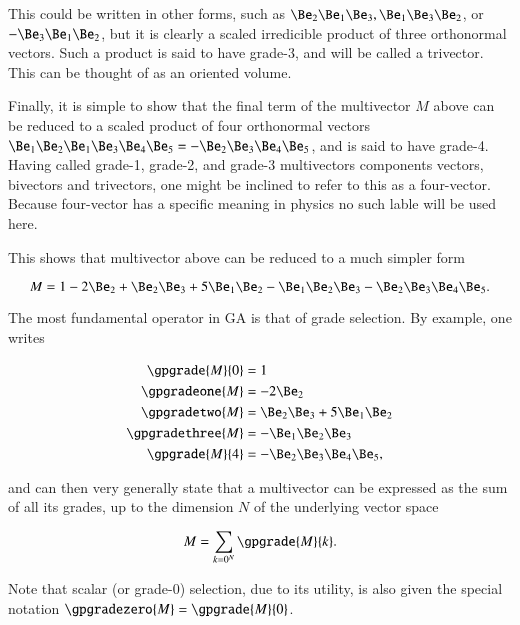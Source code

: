 This could be written in other forms, such as \( \Be_2 \Be_1 \Be_3, \Be_1 \Be_3 \Be_2 \), or \( -\Be_3 \Be_1 \Be_2 \), but it is clearly a scaled irredicible product of three orthonormal vectors.  Such a product is said to have grade-3, and will be called a trivector.  This can be thought of as an oriented volume.

Finally, it is simple to show that the final term of the multivector \( M \) above can be reduced to a scaled product of four orthonormal vectors \( \Be_1 \Be_2 \Be_1 \Be_3 \Be_4 \Be_5 = -\Be_2 \Be_3 \Be_4 \Be_5 \), and is said to have grade-4.  Having called grade-1, grade-2, and grade-3 multivectors components vectors, bivectors and trivectors, one might be inclined to refer to this as a four-vector.  Because four-vector has a specific meaning in physics no such lable will be used here.

This shows that multivector above can be reduced to a much simpler form

\begin{dmath}\label{eqn:SimpleProducts:120}
M = 1 - 2 \Be_2  + \Be_2 \Be_3 + 5 \Be_1 \Be_2 - \Be_1 \Be_2 \Be_3 -\Be_2 \Be_3 \Be_4 \Be_5.
\end{dmath}

The most fundamental operator in GA is that of grade selection.  By example, one writes

\begin{dmath}\label{eqn:SimpleProducts:140}
\begin{aligned}
   \gpgrade{M}{0} &= 1 \\
   \gpgradeone{M} &= - 2 \Be_2 \\
   \gpgradetwo{M} &= \Be_2 \Be_3 + 5 \Be_1 \Be_2 \\
   \gpgradethree{M} &= - \Be_1 \Be_2 \Be_3 \\
   \gpgrade{M}{4} &= -\Be_2 \Be_3 \Be_4 \Be_5,
\end{aligned}
\end{dmath}

and can then very generally state that a multivector can be expressed as the sum of all its grades, up to the dimension \( N \) of the underlying vector space

\begin{dmath}\label{eqn:SimpleProducts:160}
   M = \sum_{k = 0^N} \gpgrade{M}{k}.
\end{dmath}

Note that scalar (or grade-0) selection, due to its utility, is also given the special notation \( \gpgradezero{M} = \gpgrade{M}{0} \).

